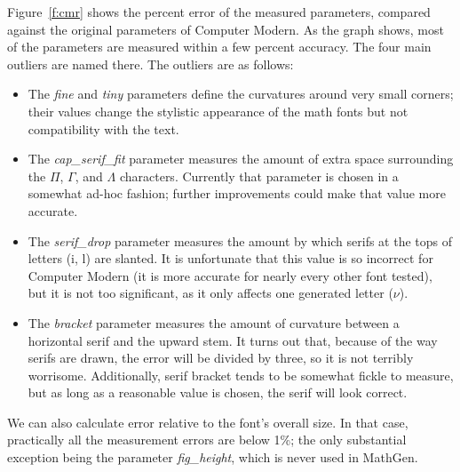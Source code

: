 Figure~\ref{f:cmr} shows the percent error of the measured parameters, compared
against the original parameters of Computer Modern. As the graph shows, most of
the parameters are measured within a few percent accuracy. The four main
outliers are named there. The outliers are as follows:
\begin{itemize}
\item The \emph{fine} and \emph{tiny} parameters define the curvatures around
very small corners; their values change the stylistic appearance of the math
fonts but not compatibility with the text.
\item The \emph{cap\_serif\_fit} parameter measures the amount of extra space
surrounding the $\Pi$, $\Gamma$, and $\Lambda$ characters. Currently that
parameter is chosen in a somewhat ad-hoc fashion; further improvements could
make that value more accurate.
\item The \emph{serif\_drop} parameter measures the amount by which serifs at
the tops of letters (i, l) are slanted. It is unfortunate that this value is so
incorrect for Computer Modern (it is more accurate for nearly every other font
tested), but it is not too significant, as it only affects one generated letter
($\nu$).
\item The \emph{bracket} parameter measures the amount of curvature between a
horizontal serif and the upward stem. It turns out that, because of the way
serifs are drawn, the error will be divided by three, so it is not terribly
worrisome. Additionally, serif bracket tends to be somewhat fickle to measure,
but as long as a reasonable value is chosen, the serif will look correct.
\end{itemize}
We can also calculate error relative to the font's overall size. In that case,
practically all the measurement errors are below 1\%; the only substantial
exception being the parameter \emph{fig\_height}, which is never used in
MathGen.
